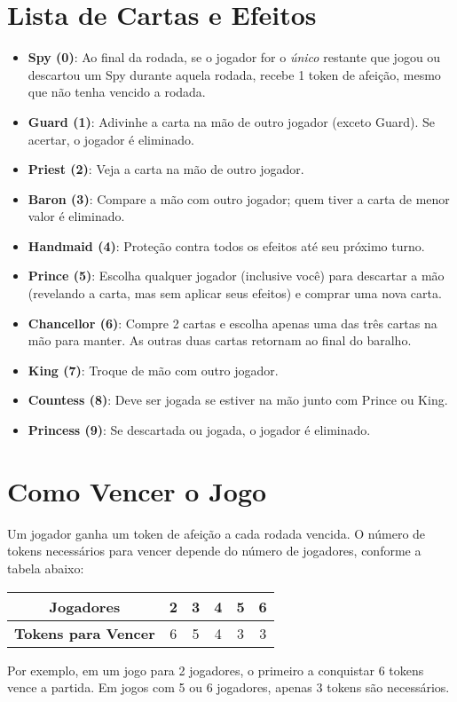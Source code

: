 \documentclass{scrreprt}
\begin{document}
\section{Lista de Cartas e Efeitos}
\begin{itemize}
    \item \textbf{Spy (0)}: Ao final da rodada, se o jogador for o \emph{único} restante que jogou ou descartou um Spy durante aquela rodada, recebe 1 token de afeição, mesmo que não tenha vencido a rodada.
    \item \textbf{Guard (1)}: Adivinhe a carta na mão de outro jogador (exceto Guard). Se acertar, o jogador é eliminado.
    \item \textbf{Priest (2)}: Veja a carta na mão de outro jogador.
    \item \textbf{Baron (3)}: Compare a mão com outro jogador; quem tiver a carta de menor valor é eliminado.
    \item \textbf{Handmaid (4)}: Proteção contra todos os efeitos até seu próximo turno.
    \item \textbf{Prince (5)}: Escolha qualquer jogador (inclusive você) para descartar a mão (revelando a carta, mas sem aplicar seus efeitos) e comprar uma nova carta.
    \item \textbf{Chancellor (6)}: Compre 2 cartas e escolha apenas uma das três cartas na mão para manter. As outras duas cartas retornam ao final do baralho.
    \item \textbf{King (7)}: Troque de mão com outro jogador.
    \item \textbf{Countess (8)}: Deve ser jogada se estiver na mão junto com Prince ou King.
    \item \textbf{Princess (9)}: Se descartada ou jogada, o jogador é eliminado.
\end{itemize}

\section{Como Vencer o Jogo}

Um jogador ganha um token de afeição a cada rodada vencida. O número de tokens necessários para vencer depende do número de jogadores, conforme a tabela abaixo:

\begin{center}
\begin{tabular}{|c|c|c|c|c|c|}
\hline
\textbf{Jogadores} & 2 & 3 & 4 & 5 & 6 \\
\hline
\textbf{Tokens para Vencer} & 6 & 5 & 4 & 3 & 3 \\
\hline
\end{tabular}
\end{center}

Por exemplo, em um jogo para 2 jogadores, o primeiro a conquistar 6 tokens vence a partida. Em jogos com 5 ou 6 jogadores, apenas 3 tokens são necessários.
\end{document}
